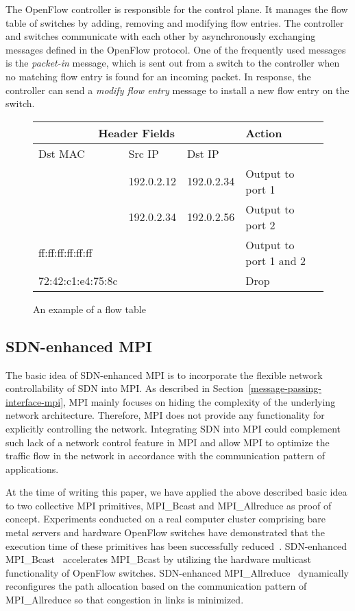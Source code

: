 The OpenFlow controller is responsible for the control plane. It manages
the flow table of switches by adding, removing and modifying flow
entries. The controller and switches communicate with each other by
asynchronously exchanging messages defined in the OpenFlow protocol. One
of the frequently used messages is the \emph{packet-in} message, which
is sent out from a switch to the controller when no matching flow entry
is found for an incoming packet. In response, the controller can send a
\emph{modify flow entry} message to install a new flow entry on the
switch.

\begin{figure}
    \centering
    \footnotesize
    \begin{tabular}{lllll}
        \hline
        \multicolumn{3}{c}{Header Fields}            &  Action                  \\ \hline
        Dst MAC           & Src IP     & Dst IP      &                          \\ \hline
                          & 192.0.2.12 & 192.0.2.34  & Output to port 1         \\
                          & 192.0.2.34 & 192.0.2.56  & Output to port 2         \\
        ff:ff:ff:ff:ff:ff &            &             & Output to port 1 and 2   \\
        72:42:c1:e4:75:8c &            &             & Drop
    \end{tabular}
    \caption{An example of a flow table}%
    \label{tbl:flow-table}
\end{figure}

\hypertarget{sdn-enhanced-mpi}{%
\subsection{SDN-enhanced MPI}\label{sdn-enhanced-mpi}}

The basic idea of SDN-enhanced MPI is to incorporate the flexible
network controllability of SDN into MPI\@. As described in
Section~\ref{message-passing-interface-mpi}, MPI mainly focuses on hiding the
complexity of the underlying network architecture. Therefore, MPI does not
provide any functionality for explicitly controlling the network. Integrating
SDN into MPI could complement such lack of a network control feature in MPI
and allow MPI to optimize the traffic flow in the network in accordance with
the communication pattern of applications.

At the time of writing this paper, we have applied the above described
basic idea to two collective MPI primitives, MPI\_Bcast and
MPI\_Allreduce as proof of concept. Experiments conducted on a real
computer cluster comprising bare metal servers and hardware OpenFlow
switches have demonstrated that the execution time of these primitives
has been successfully reduced~\autocites{Dashdavaa2014}{Takahashi2014}.
SDN-enhanced MPI\_Bcast~\autocite{Dashdavaa2014} accelerates MPI\_Bcast
by utilizing the hardware multicast functionality of OpenFlow switches.
SDN-enhanced MPI\_Allreduce~\autocite{Takahashi2014} dynamically
reconfigures the path allocation based on the communication pattern of
MPI\_Allreduce so that congestion in links is minimized.

